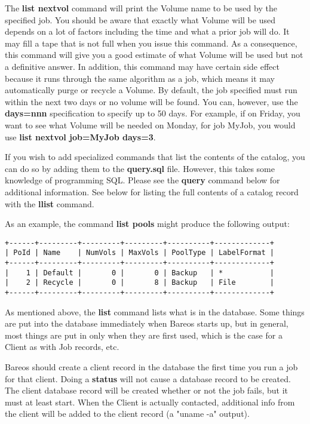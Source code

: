 \begin{description}
   The {\bf list nextvol} command will print the Volume name to be used by
   the specified job.  You should be aware that exactly what Volume will be
   used depends on a lot of factors including the time and what a prior job
   will do.  It may fill a tape that is not full when you issue this
   command.  As a consequence, this command will give you a good estimate
   of what Volume will be used but not a definitive answer.  In addition,
   this command may have certain side effect because it runs through the
   same algorithm as a job, which means it may automatically purge or
   recycle a Volume. By default, the job specified must run within the
   next two days or no volume will be found. You can, however, use the
   {\bf days=nnn} specification to specify up to 50 days. For example,
   if on Friday, you want to see what Volume will be needed on Monday,
   for job MyJob, you would use {\bf list nextvol job=MyJob days=3}.

   If you wish to add specialized commands that list the contents of the
   catalog, you can do so by adding them to the {\bf query.sql} file.
   However, this takes some knowledge of programming SQL. Please see the
   {\bf query} command below for additional information.  See below for
   listing the full contents of a catalog record with the {\bf llist}
   command.

   As an example, the command {\bf list pools} might produce  the following
   output:

\footnotesize
\begin{verbatim}
+------+---------+---------+---------+----------+-------------+
| PoId | Name    | NumVols | MaxVols | PoolType | LabelFormat |
+------+---------+---------+---------+----------+-------------+
|    1 | Default |       0 |       0 | Backup   | *           |
|    2 | Recycle |       0 |       8 | Backup   | File        |
+------+---------+---------+---------+----------+-------------+
\end{verbatim}
\normalsize

   As mentioned above, the {\bf list} command lists what is in the
   database.  Some things are put into the database immediately when Bareos
   starts up, but in general, most things are put in only when they are
   first used, which is the case for a Client as with Job records, etc.

   Bareos should create a client record in the database the first time you
   run a job for that client.  Doing a {\bf status} will not cause a
   database record to be created.  The client database record will be
   created whether or not the job fails, but it must at least start.  When
   the Client is actually contacted, additional info from the client will
   be added to the client record (a "uname -a" output).


\end{description}
